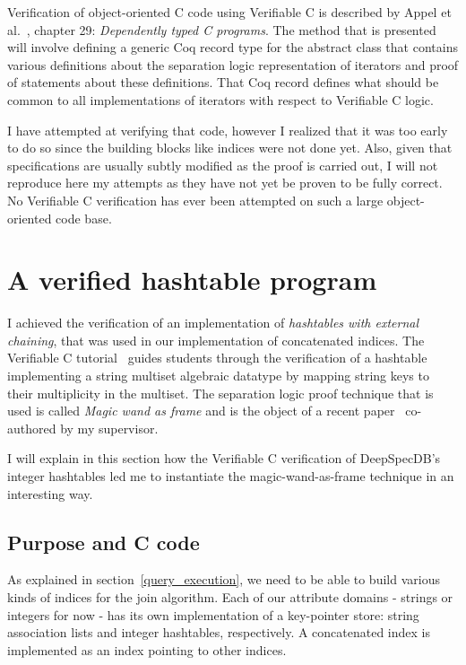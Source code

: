 \documentclass[11pt]{article}
\begin{document}
{Verification of object-oriented C code using Verifiable C is described by Appel et al.~\cite{PLCC}, chapter 29: \emph{Dependently typed C programs}.
The method that is presented will involve defining a generic Coq record type for the  abstract class that contains various definitions about the separation logic representation of iterators
and proof of statements about these definitions.
That Coq record defines what should be common to all implementations of iterators with respect to Verifiable C logic.

I have attempted at verifying that code, however I realized that it was too early to do so since the building blocks
like indices were not done yet.
Also, given that specifications are usually subtly modified as the proof is carried out,
I will not reproduce here my attempts as they have not yet be proven to be fully correct.
No Verifiable C verification has ever been attempted on such a large object-oriented code base.

\section{A verified hashtable program}
\label{hashtable}
I achieved the verification of an implementation of \emph{hashtables with external chaining}, that was used in our implementation of concatenated indices. The Verifiable C tutorial~\cite{VCT} guides students through the verification of a hashtable implementing a string multiset algebraic datatype by mapping string keys to their multiplicity in the multiset. The separation logic proof technique that is used is called \emph{Magic wand as frame} and is the object of a recent paper~\cite{MWAF} co-authored by my supervisor.

I will explain in this section how the Verifiable C verification of DeepSpecDB's integer hashtables led me to instantiate the magic-wand-as-frame technique in an interesting way.

\subsection{Purpose and C code}

As explained in section~\ref{query_execution}, we need to be able to build various kinds of indices for the join algorithm. Each of our attribute domains - strings or integers for now - has its own implementation of a key-pointer store: string association lists and integer hashtables, respectively. A concatenated index is implemented as an index pointing to other indices.

}
\end{document}
